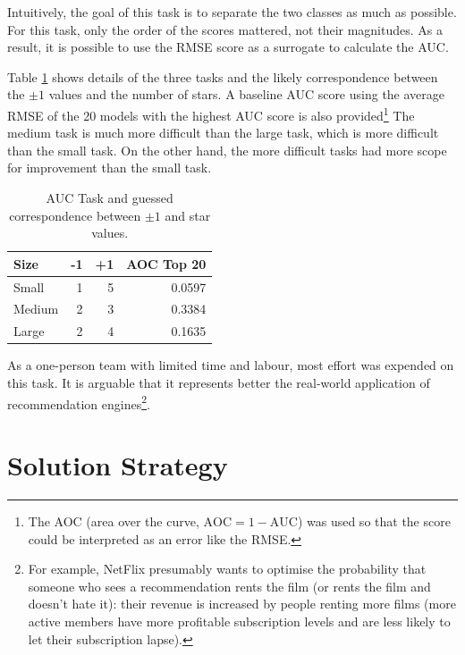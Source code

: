 \documentclass{article}
\begin{document}
Intuitively, the goal of this task is to separate the two classes as much as possible.  For this task, only the order of the scores mattered, not their magnitudes.  As a result, it is possible to use the RMSE score as a surrogate to calculate the AUC.

Table \ref{auc} shows details of the three tasks and the likely correspondence between the $\pm 1$ values and the number of stars.  A baseline AUC score using the average RMSE of the 20 models with the highest AUC score is also provided\footnote{The AOC (area over the curve, $\mathrm{AOC} = 1 - \mathrm{AUC}$) was used so that the score could be interpreted as an error like the RMSE.}
The medium task is much more difficult than the large task, which is more difficult than the small task.  On the other hand, the more difficult tasks had more scope for improvement than the small task.

\begin{table}[t]
\caption{AUC Task and guessed correspondence between $\pm 1$ and star values.}
\label{auc}
\vskip 0.15in
\begin{center}
\begin{small}
\begin{sc}
\begin{tabular}{lrrr}
\hline
\abovespace\belowspace
Size & -1 & +1 & AOC Top 20 \\
\hline
\abovespace
Small    & 1 & 5 & 0.0597 \\
Medium   & 2 & 3 & 0.3384 \\
\belowspace
Large    & 2 & 4 & 0.1635 \\
\hline
\end{tabular}
\end{sc}
\end{small}
\end{center}
\vskip -0.1in
\end{table}

As a one-person team with limited time and labour, most effort was expended on this task.  It is arguable that it represents better the real-world application of recommendation engines\footnote{For example, NetFlix presumably wants to optimise the probability that someone who sees a recommendation rents the film (or rents the film and doesn't hate it): their revenue is increased by people renting more films (more active members have more profitable subscription levels and are less likely to let their subscription lapse).}.

\section{Solution Strategy}
\end{document}
